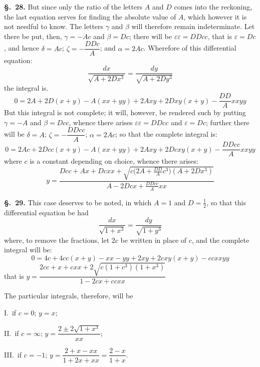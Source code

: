\documentclass{article}
\begin{document}
\textbf{§.~28.} But since only the ratio of the letters $A$ and $D$ comes into the reckoning, the
last equation serves for finding the absolute value of $A$, which however it is not needful to know.
The letters $\gamma$ and $\beta$ will therefore remain indeterminate. Let there be put, then, $\gamma = -Ac$ and $\beta = Dc$; there will be
$\varepsilon\varepsilon = DDcc$, that is $\varepsilon = Dc$, and hence $\delta = Ac$;
$\zeta = -\dfrac{DDc}{A}$; and $\alpha = 2Ac$. Wherefore of this differential equation:
\[ \frac{dx}{\sqrt{A + 2Dx^{3}}} = \frac{dy}{\sqrt{A + 2Dy^{3}}} \]
the integral is.
\[ 0 = 2A + 2D(x+y) - A(xx+yy) + 2Axy + 2Dxy(x+y) - \frac{DD}{A}xxyy \]
But this integral is not complete; it will, however, be rendered such by putting $\gamma = -A$ and $\beta = Dcc$,
whence there arises $\varepsilon\varepsilon = DDcc$ and $\varepsilon = Dc$; further there will be $\delta = A$;
$\zeta = -\dfrac{DDcc}{A}$; $\alpha = 2Ac$; so that the complete integral is:
\[ 0 = 2Ac + 2Dcc(x+y) - A(xx+yy) + 2Axy + 2Dcxy(x+y) - \frac{DDcc}{A}xxyy \]
where $c$ is a constant depending on choice, whence there arises:
\[ y = \frac{Dcc + Ax + Dcxx + \sqrt{c\bigl(2A + \frac{DD}{A}c^{3}\bigr)(A + 2Dx^{3})}}{A - 2Dcx + \frac{DDcc}{A}xx} \]

\textbf{§.~29.} This case deserves to be noted, in which $A = 1$ and $D = \frac{1}{2}$, so that this
differential equation be had
\[ \frac{dx}{\sqrt{1 + x^{3}}} = \frac{dy}{\sqrt{1 + y^{3}}} \]
where, to remove the fractions, let $2c$ be written in place of $c$, and the complete integral will
be:
\[ 0 = 4c + 4cc(x+y) - xx - yy + 2xy + 2cxy(x+y) - ccxxyy \]
that is $y = \dfrac{2cc + x + cxx + 2\sqrt{c(1+c^{3})(1+x^{3})}}{1 - 2cx + ccxx}$

The particular integrals, therefore, will be

I.~if $c = 0$; $y = x$;

II.~if $c = \infty$; $y = \dfrac{2 \pm 2\sqrt{1+x^{3}}}{xx}$;

III.~if $c = -1$; $y = \dfrac{2 + x - xx}{1 + 2x + xx} = \dfrac{2-x}{1+x}$.
\end{document}
